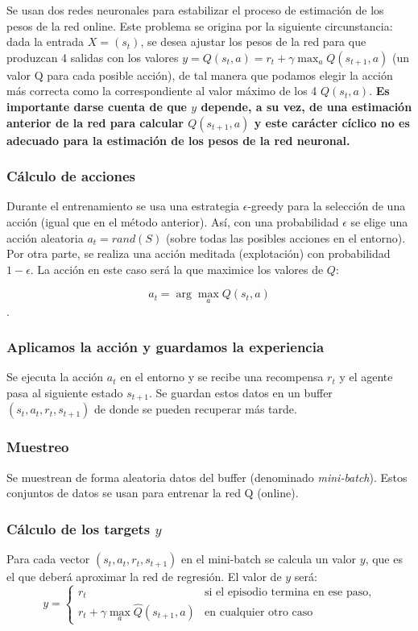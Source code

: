\documentclass{article}
\begin{document}
Se usan dos redes neuronales para estabilizar el proceso de estimación de los pesos de la red online. Este problema se origina por la siguiente circunstancia: dada la entrada $X=(s_t)$, se desea ajustar los pesos de la red para que produzcan 4 salidas con los valores $y=Q(s_t, a) = r_t + \gamma\max_a Q(s_{t+1}, a)$ (un valor Q para cada posible acción), de tal manera que podamos elegir la acción más correcta como la correspondiente al valor máximo de los 4 $Q(s_t, a)$. \textbf{Es importante darse cuenta de que $y$ depende, a su vez, de una estimación anterior de la red para calcular $Q(s_{t+1}, a)$ y este carácter cíclico no es adecuado para la estimación de los pesos de la red neuronal.} 

\subsubsection{Cálculo de acciones}
Durante el entrenamiento se usa una estrategia $\epsilon$-greedy para la selección de una acción (igual que en el método anterior). Así, con una probabilidad $\epsilon$ se elige una acción aleatoria $a_t=rand(S)$ (sobre todas las posibles acciones en el entorno). Por otra parte,  se realiza una acción meditada (explotación) con probabilidad $1-\epsilon$. La acción en este caso será la que maximice los valores de $Q$: 

$$a_t = \arg \max_a{Q(s_t, a)}$$.





\subsubsection{Aplicamos la acción y guardamos la experiencia}
Se ejecuta la acción $a_t$ en el entorno y se recibe una recompensa $r_t$ y el agente pasa al siguiente estado $s_{t+1}$. Se guardan estos datos en un buffer $(s_t, a_t, r_t, s_{t+1})$ de donde se pueden recuperar más tarde.

\subsubsection{Muestreo}
Se muestrean de forma aleatoria datos del buffer (denominado \textit{mini-batch}). Estos conjuntos de datos se usan para entrenar la red Q (online).

\subsubsection{Cálculo de los targets $y$}
Para cada vector $(s_t, a_t, r_t, s_{t+1})$ en el mini-batch se calcula un valor $y$, que es el que deberá aproximar la red de regresión. El valor de $y$ será:
\begin{equation*}
y = 
\begin{cases}
    r_t & \text{si el episodio termina en ese paso}, \\
    r_t + \gamma \max_a{\hat{Q}(s_{t+1}, a)}   & \text{en cualquier otro caso } 
\end{cases}
\end{equation*}
\end{document}
